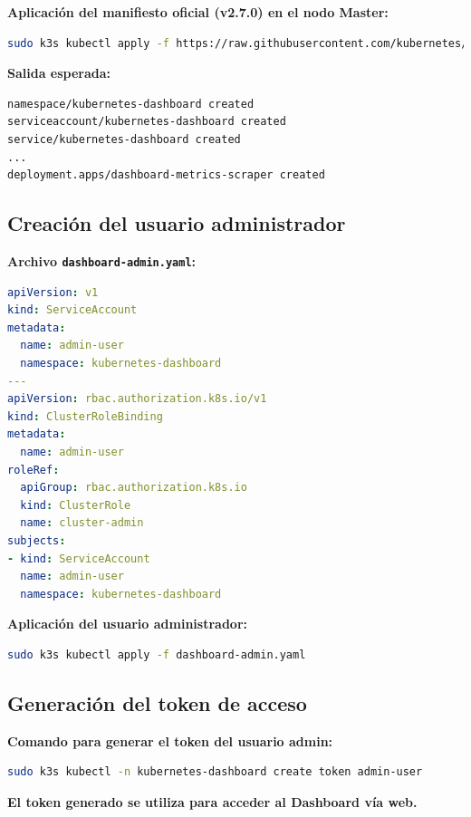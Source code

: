 \documentclass[12pt, a4paper]{article}
\begin{document}
\textbf{Aplicación del manifiesto oficial (v2.7.0) en el nodo Master:}

\begin{lstlisting}[language=bash]
sudo k3s kubectl apply -f https://raw.githubusercontent.com/kubernetes/dashboard/v2.7.0/aio/deploy/recommended.yaml
\end{lstlisting}

\textbf{Salida esperada:}
\begin{lstlisting}[language=bash]
namespace/kubernetes-dashboard created
serviceaccount/kubernetes-dashboard created
service/kubernetes-dashboard created
...
deployment.apps/dashboard-metrics-scraper created
\end{lstlisting}

\subsection{Creación del usuario administrador}

\textbf{Archivo \texttt{dashboard-admin.yaml}:}

\begin{lstlisting}[language=yaml]
apiVersion: v1
kind: ServiceAccount
metadata:
  name: admin-user
  namespace: kubernetes-dashboard
---
apiVersion: rbac.authorization.k8s.io/v1
kind: ClusterRoleBinding
metadata:
  name: admin-user
roleRef:
  apiGroup: rbac.authorization.k8s.io
  kind: ClusterRole
  name: cluster-admin
subjects:
- kind: ServiceAccount
  name: admin-user
  namespace: kubernetes-dashboard
\end{lstlisting}

\textbf{Aplicación del usuario administrador:}

\begin{lstlisting}[language=bash]
sudo k3s kubectl apply -f dashboard-admin.yaml
\end{lstlisting}

\subsection{Generación del token de acceso}

\textbf{Comando para generar el token del usuario admin:}

\begin{lstlisting}[language=bash]
sudo k3s kubectl -n kubernetes-dashboard create token admin-user
\end{lstlisting}

\textbf{El token generado se utiliza para acceder al Dashboard vía web.}
\end{document}

